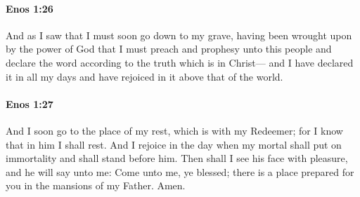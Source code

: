 		\paragraph{Enos 1:26} %
			\label{ENOS-1-26}

			And as I saw that I must soon go down to my grave,
			having been wrought upon by the power of God
			that I must preach and prophesy unto this people
			and declare the word according to the truth which is in Christ---
			and I have declared it in all my days
			and have rejoiced in it above that of the world.

		\paragraph{Enos 1:27} %
			\label{ENOS-1-27}

			And I soon go to the place of my rest,
			which is with my Redeemer;
			for I know that in him I shall rest.
			And I rejoice in the day
			when my mortal shall put on immortality
			and shall stand before him.
			Then shall I see his face with pleasure,
			and he will say unto me:
			Come unto me, ye blessed;
			there is a place prepared for you in the mansions of my Father.
			Amen.
